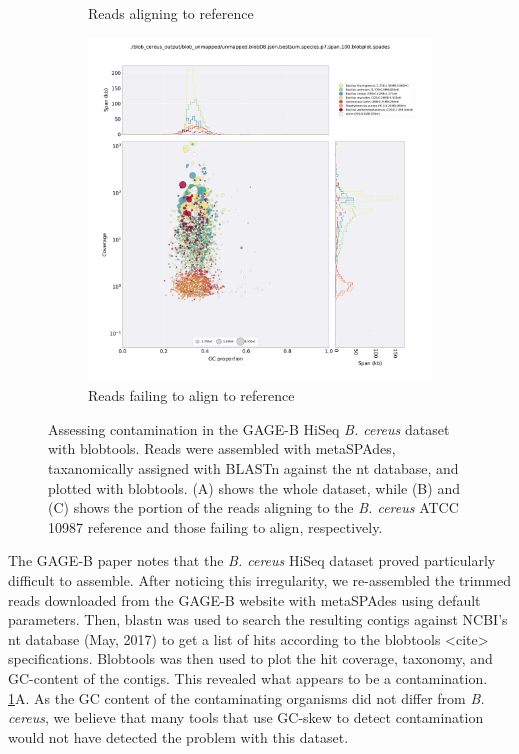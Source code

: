 \documentclass[10pt]{article}
\begin{document}
\begin{figure}[H]
\begin{subfigure}[b]{.5\textwidth}
    \caption{Reads aligning to reference}
  \end{subfigure}
  \begin{subfigure}[b]{.5\textwidth}
    \includegraphics[width=.95\textwidth]{unmapped.blobDB.json.bestsum.species.p7.span.100.blobplot.spades.png}
    \caption{Reads failing to align to reference}
  \end{subfigure}
  \caption{Assessing contamination in the GAGE-B HiSeq \textit{B. cereus} dataset with blobtools. Reads were assembled with metaSPAdes, taxanomically assigned with BLASTn against the nt database, and plotted with blobtools.  (A) shows the whole dataset, while (B) and (C) shows the portion of the reads aligning to the \textit{B. cereus} ATCC 10987 reference and those failing to align, respectively.}
  \label{fig:contamination_all}
\end{figure}

The GAGE-B paper \cite{Magoc2013} notes that the \textit{B. cereus} HiSeq dataset proved particularly difficult to assemble. After noticing this irregularity, we re-assembled the trimmed reads downloaded from the GAGE-B website with metaSPAdes\cite{Nurk2017}  using default parameters.  Then, blastn was used to search the resulting contigs against NCBI's nt database (May, 2017) to get a list of hits according to the blobtools <cite> specifications. Blobtools was then used to plot the hit coverage, taxonomy, and GC-content of the contigs.  This revealed what appears to be a contamination. \ref{fig:contamination_all}A. As the GC content of the contaminating organisms did not differ from \textit{B. cereus}, we believe that many tools that use GC-skew to detect contamination would not have detected the problem with this dataset.
\end{document}
